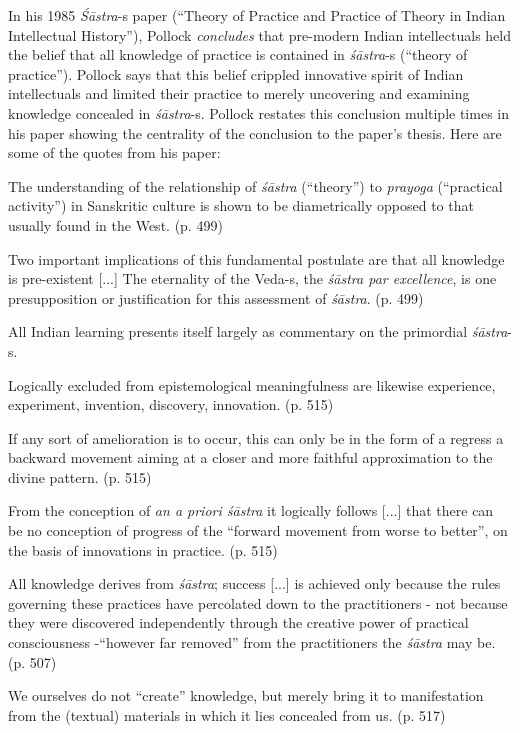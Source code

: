 In his 1985 {\sl Śāstra}-s paper (``Theory of Practice and Practice of Theory in Indian Intellectual History''), Pollock {\sl concludes} that pre-modern Indian intellectuals held the belief that all knowledge of practice is contained in {\sl śāstra}-s (``theory  of practice'').  Pollock says that this belief crippled innovative spirit of Indian intellectuals and limited their practice to merely uncovering and examining knowledge concealed in {\sl śāstra}-s. Pollock restates this conclusion multiple times in his paper showing the centrality of the conclusion to the paper's thesis. Here are some of the quotes from his paper:
\begin{myquote}
The understanding of the relationship of {\sl śāstra} (``theory'') to {\sl prayoga} (``practical activity'') in Sanskritic culture is shown to be diametrically opposed to that usually found in the West. (p. 499)

Two important implications of this fundamental postulate are that all knowledge is pre-existent [...] The eternality of the Veda-s, the {\sl śāstra par excellence}, is one presupposition or justification for this assessment of {\sl śāstra}. (p. 499)

All Indian learning presents itself largely as commentary on the primordial {\sl śāstra}-s.

Logically excluded from epistemological meaningfulness are likewise experience, experiment, invention, discovery, innovation. (p. 515)

If any sort of amelioration is to occur, this can only be in the form of a regress a backward movement aiming at a closer and more faithful approximation to the divine pattern. (p. 515)

From the conception of {\sl an a priori śāstra} it logically follows [...] that there can be no conception of progress of the ``forward movement from worse to better'', on the basis of innovations in practice. (p. 515)

All knowledge derives from {\sl śāstra}; success [...] is achieved only because the rules governing these practices have percolated down to the practitioners - not because they were discovered independently through the creative power of practical consciousness -``however far removed'' from the practitioners the {\sl śāstra} may be. (p. 507)

We ourselves do not ``create'' knowledge, but merely bring it to manifestation from the (textual) materials in which it lies concealed from us. (p. 517) 
\end{myquote}


